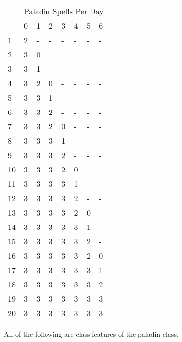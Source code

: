 \begin{floatingfigure}{3.0in}
\begin{small}
\noindent\begin{tabular}{llllllll} & \multicolumn{7}{l}{Paladin Spells Per Day}\\
   &0 &1 &2 &3 &4 &5 &6 \\
1  &2 &- &- &- &- &- &- \\
2  &3 &0 &- &- &- &- &- \\
3  &3 &1 &- &- &- &- &- \\
4  &3 &2 &0 &- &- &- &- \\
5  &3 &3 &1 &- &- &- &- \\
6  &3 &3 &2 &- &- &- &- \\
7  &3 &3 &2 &0 &- &- &- \\
8  &3 &3 &3 &1 &- &- &- \\
9  &3 &3 &3 &2 &- &- &- \\
10 &3 &3 &3 &2 &0 &- &- \\
11 &3 &3 &3 &3 &1 &- &- \\
12 &3 &3 &3 &3 &2 &- &- \\
13 &3 &3 &3 &3 &2 &0 &- \\
14 &3 &3 &3 &3 &3 &1 &- \\
15 &3 &3 &3 &3 &3 &2 &- \\
16 &3 &3 &3 &3 &3 &2 &0 \\
17 &3 &3 &3 &3 &3 &3 &1 \\
18 &3 &3 &3 &3 &3 &3 &2 \\
19 &3 &3 &3 &3 &3 &3 &3 \\
20 &3 &3 &3 &3 &3 &3 &3 \\
\end{tabular}
\end{small}
\end{floatingfigure}

\smallskip \noindent All of the following are class features of the paladin class.



